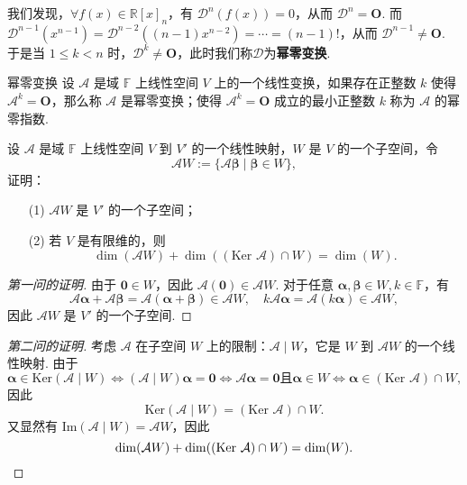\documentclass[12pt, a4paper,newtx]{ctexart}
\begin{document}
我们发现，$\forall f(x) \in \mathbb R[x]_n$，有 $\mathcal D^n(f(x)) = 0$，从而 $\mathcal D^n = \bm O$. 而$\mathcal D^{n-1}(x^{n-1}) = \mathcal D^{n-2}((n-1)x^{n-2}) = \cdots = (n-1)!$，从而 $\mathcal D^{n-1} \neq \bm O$. 于是当 $1 \leqslant k < n$ 时，$\mathcal D^k \neq \bm O$，此时我们称$\mathcal D$为\textbf{幂零变换}.
\begin{definition}{幂零变换}{}\kaishu 
	设 $\mathcal A$ 是域 $\mathbb F$ 上线性空间 $V$ 上的一个线性变换，如果存在正整数 $k$ 使得 $\mathcal A^k = \bm O$，那么称 $\mathcal A$ 是{\heiti 幂零变换}；使得 $\mathcal A^k = \bm O$ 成立的最小正整数 $k$ 称为 $\mathcal A$ 的{\heiti 幂零指数}. 
\end{definition}
\begin{example}{}{}
	设 $\mathcal{A}$ 是域 $\mathbb F$ 上线性空间 $V$ 到 $V'$ 的一个线性映射，$W$ 是 $V$ 的一个子空间，令
	\[
	\mathcal{A}W := \{ \mathcal{A}\bm\beta \mid \bm\beta \in W \},
	\]
	证明：
	\begin{enumerate}
		\item[(1)] $\mathcal{A}W$ 是 $V'$ 的一个子空间；
		\item[(2)] 若 $V$ 是有限维的，则\begin{equation}
			\dim(\mathcal{A}W) + \dim((\text{Ker } \mathcal{A}) \cap W) = \dim(W).
		\end{equation}
	\end{enumerate}
\end{example}
\begin{proof}[第一问的证明]
	由于 $\bm 0 \in W$，因此 $\mathcal{A}(\bm 0) \in \mathcal{A}W$. 对于任意 $\bm\alpha, \bm\beta \in W, k \in \mathbb F$，有
	\[
	\mathcal{A}\bm\alpha + \mathcal{A}\bm\beta = \mathcal{A}(\bm\alpha + \bm\beta) \in \mathcal{A}W, \quad k\mathcal{A}\bm\alpha = \mathcal{A}(k\bm\alpha) \in \mathcal{A}W,
	\]
	因此 $\mathcal{A}W$ 是 $V'$ 的一个子空间. 
\end{proof}
\begin{proof}[第二问的证明]
	考虑 $\mathcal{A}$ 在子空间 $W$ 上的限制：$\mathcal{A}\mid W$，它是 $W$ 到 $\mathcal{A}W$ 的一个线性映射. 由于
	\[
	\bm\alpha \in \text{Ker}(\mathcal{A}\mid W) \iff (\mathcal{A}\mid W)\bm\alpha = \bm 0 \iff \mathcal{A}\bm\alpha = \bm 0 \text{且} \bm\alpha \in W \iff \bm\alpha \in (\text{Ker } \mathcal{A}) \cap W,
	\]
	因此
	\[
	\text{Ker}(\mathcal{A}\mid W) = (\text{Ker } \mathcal{A}) \cap W.
	\]
	又显然有 $\text{Im}(\mathcal{A}\mid W) = \mathcal{A}W$，因此
	\[
	\dim(\mathcal{A}W) + \dim((\text{Ker } \mathcal{A}) \cap W) = \dim(W).\qedhere
	\]
\end{proof}
\end{document}
